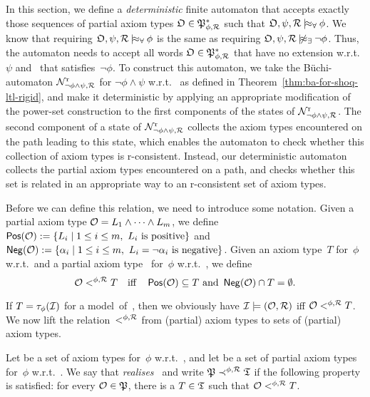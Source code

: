 In this section, we define a \emph{deterministic} finite automaton that accepts
exactly those sequences of partial axiom types $\mathfrak{O}\in\mathfrak{P}_{\phi,\mathcal{R}}^*$ such
that $\Omf,\psi,\Rmc\modelsal\phi$.  We know that requiring
$\Omf,\psi,\Rmc\modelsal\phi$ is the same as requiring
$\Omf,\psi,\Rmc\notmodelsex\lnot\phi$.  Thus, the automaton needs to accept all
words $\mathfrak{O}\in\mathfrak{P}_{\phi,\mathcal{R}}^*$ that have no extension w.r.t.~$\psi$ and~\Rmc
that satisfies~$\lnot\phi$.
%
To construct this automaton, we take the Büchi-automaton
$\mathcal{N}_{\lnot\phi\land\psi,\mathcal{R}}^\text{r}$ for $\lnot\phi\land\psi$ w.r.t.~\Rmc
as defined in Theorem~\ref{thm:ba-for-shoq-ltl-rigid}, and make it deterministic
by applying an appropriate modification of the power-set construction to the
first components of the states of $\mathcal{N}_{\lnot\phi\land\psi,\mathcal{R}}^\text{r}$.
The second component of a state of $\mathcal{N}_{\lnot\phi\land\psi,\mathcal{R}}^\text{r}$
collects the axiom types encountered on the path leading to this state, which
enables the automaton to check whether this collection of axiom types is
r-consistent.  Instead, our deterministic automaton collects the partial axiom
types encountered on a path, and checks whether this set is related in an
appropriate way to an r-consistent set of axiom types.

Before we can define this relation, we need to introduce some notation.  Given a
partial axiom type $\mathcal{O}=L_1\land\dots\land L_m$, we define
$\operatorname{\mathsf{Pos}}(\mathcal{O}):=\{L_i\mid 1\le i\le m,\ L_i\ \text{is positive}\}$
and
$\operatorname{\mathsf{Neg}}(\mathcal{O}):=\{\alpha_i\mid 1\le i\le m,\ L_i=\lnot\alpha_i\ \text{is negative}\}$.
%
Given an axiom type~$T$ for~$\phi$ w.r.t.~\Rmc and a partial axiom type~\Omc
for~$\phi$ w.r.t.~\Rmc, we define
\[\Omc<^{\phi,\Rmc}T\quad\text{iff}\quad%
    \Pos(\Omc)\subseteq T\ \text{and}\ \Neg(\Omc)\cap T=\emptyset.\]

\noindent
If $T=\tau_\phi(\mathcal{I})$ for a model~\Imc of~\Rmc, then we obviously have
$\mathcal{I}\models(\mathcal{O},\mathcal{R})$ iff $\mathcal{O}<^{\phi,\mathcal{R}}T$.  We now lift the
relation~$<^{\phi,\mathcal{R}}$ from (partial) axiom types to sets of (partial) axiom
types.

\begin{definition}[Realisation]
    Let \Tmf be a set of axiom types for~$\phi$ w.r.t.~\Rmc, and let \Pmf be a
    set of partial axiom types for~$\phi$ w.r.t.~\Rmc.
    We say that \emph{\Tmf realises~\Pmf} and write $\mathfrak{P}\prec^{\phi,\mathcal{R}}\mathfrak{T}$
    if the following property is satisfied: for every $\mathcal{O}\in\mathfrak{P}$, there is a
    $T\in\mathfrak{T}$ such that $\mathcal{O}<^{\phi,\mathcal{R}}T$.
\end{definition}

